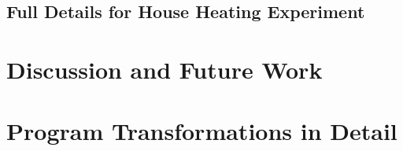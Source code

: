 


\subsection{Full Details for House Heating Experiment}
\label{sec:app:heating}



\section{Discussion and Future Work}
\label{sec:disc}



\section{Program Transformations in Detail}
\label{sec:program-transformations}


